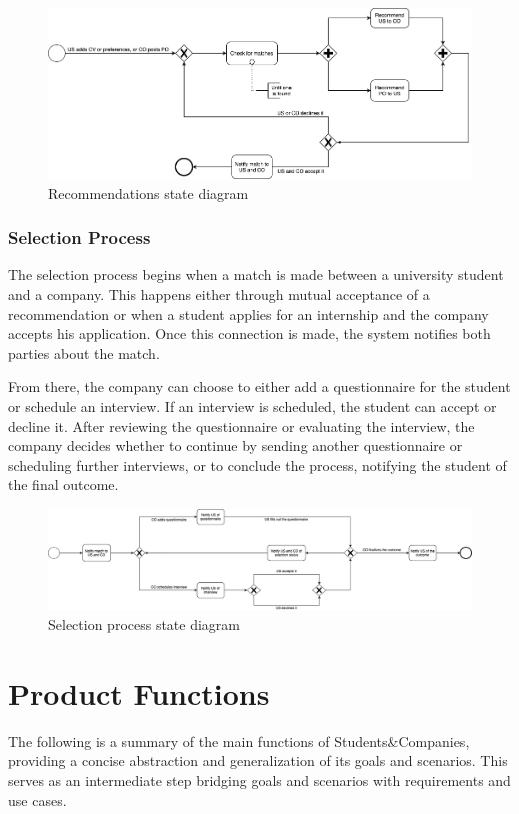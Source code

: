 \begin{figure}
    \centering
    \includegraphics[width=14cm]{images/state-diagrams/recommendations.png}
    \caption{Recommendations state diagram}
\end{figure}

\subsubsection{Selection Process}
The selection process begins when a match is made between a university student and a company.
This happens either through mutual acceptance of a recommendation or when a student applies for an internship and the company accepts his application.
Once this connection is made, the system notifies both parties about the match.

From there, the company can choose to either add a questionnaire for the student or schedule an interview.
If an interview is scheduled, the student can accept or decline it.
After reviewing the questionnaire or evaluating the interview, the company decides whether to continue by sending another questionnaire or scheduling further interviews, or to conclude the process, notifying the student of the final outcome.

\begin{figure}
    \centering
    \includegraphics[width=16cm]{images/state-diagrams/selection-process.png}
    \caption{Selection process state diagram}
\end{figure}

\section{Product Functions}
The following is a summary of the main functions of Students\&Companies, providing a concise abstraction and generalization of its goals and scenarios.
This serves as an intermediate step bridging goals and scenarios with requirements and use cases.

